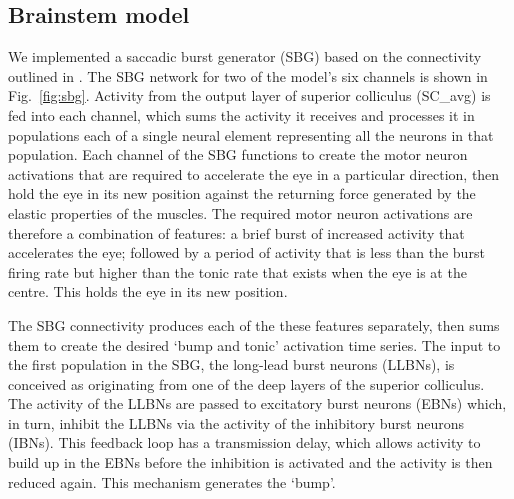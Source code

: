 \documentclass{frontiersSCNS}
\begin{document}
\subsection{Brainstem model} \label{sec:methods:brainstem}

We implemented a saccadic burst generator (SBG) based on the
connectivity outlined in \cite{gancarz_neural_1998}. The SBG network
for two of the model's six channels is shown in
Fig.~\ref{fig:sbg}.  Activity from the output layer of superior
colliculus
%
(SC\_avg) is fed into each channel, which sums the activity it
receives and processes it in populations each of a single neural
element representing all the neurons in that population. Each channel
of the SBG functions to create the motor neuron activations that are
required to accelerate the eye in a particular direction, then hold
the eye in its new position against the returning force generated by
the elastic properties of the muscles.  The required motor neuron
activations are therefore a combination of features: a brief burst of
increased activity that accelerates the eye; followed by a period of
activity that is less than the burst firing rate but higher than the
tonic rate that exists when the eye is at the centre. This holds the
eye in its new position.

The SBG connectivity produces each of the these features separately,
then sums them to create the desired `bump and tonic' activation time
series.  The input to the first population in the SBG, the long-lead
burst neurons (LLBNs), is conceived as originating from one of the
deep layers of the superior colliculus.  The activity of the LLBNs are
passed to excitatory burst neurons (EBNs) which, in turn, inhibit the
LLBNs via the activity of the inhibitory burst neurons (IBNs).  This
feedback loop has a transmission delay, which allows activity to build
up in the EBNs before the inhibition is activated and the activity is
then reduced again.  This mechanism generates the `bump'.
\end{document}
